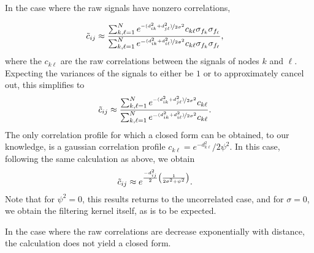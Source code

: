 \documentclass{article}
\begin{document}
In the case where the raw signals have nonzero correlations, 

\begin{align*}
    \Tilde{c}_{ij} &\approx \frac{\sum_{k, \ell =1}^N e^{\nicefrac{-(d_{ik}^2+d_{j\ell}^2)}{2\sigma^2}}c_{k\ell}\sigma_{f_k}\sigma_{f_\ell}}{\sum_{k, \ell=1}^N e^{-\nicefrac{(d_{ik}^2+ d_{i\ell}^2)}{2\sigma^2}}c_{k\ell}\sigma_{f_k}\sigma_{f_\ell}},
\end{align*}
where the $c_{k\ell}$ are the raw correlations between the signals of nodes $k$ and $\ell$. Expecting the variances of the signals to either be $1$ or to approximately cancel out, this simplifies to
\begin{align*}
    \Tilde{c}_{ij} &\approx \frac{\sum_{k, \ell =1}^N e^{\nicefrac{-(d_{ik}^2+d_{j\ell}^2)}{2\sigma^2}}c_{k\ell}}{\sum_{k, \ell=1}^N e^{-\nicefrac{(d_{ik}^2+ d_{i\ell}^2)}{2\sigma^2}}c_{k\ell}}.
\end{align*}
The only correlation profile for which a closed form can be obtained, to our knowledge, is a gaussian correlation profile $c_{k\ell} = e^{-d^2_{k\ell}}/2\psi^2$. In this case, following the same calculation as above, we obtain
\begin{align*}
    \Tilde{c}_{ij} &\approx e^{\frac{-d_{ij}^2}{2}\qty(\frac{1}{2\sigma^2+\psi^2})}.
\end{align*}
Note that for $\psi^2 = 0$, this results returns to the uncorrelated case, and for $\sigma = 0$, we obtain the filtering kernel itself, as is to be expected.

In the case where the raw correlations are decrease exponentially with distance, the calculation does not yield a closed form.
\end{document}
